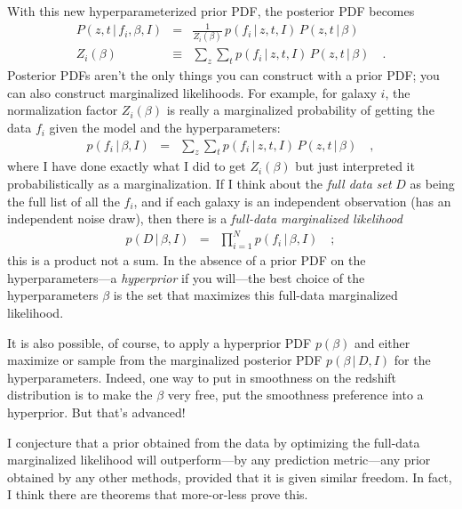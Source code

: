 \documentclass[12pt]{article}
\newcommand{\given}{\,|\,}
\begin{document}
With this new hyper\-parameterized prior PDF, the posterior PDF becomes
\begin{eqnarray}\displaystyle
P(z, t \given f_i, \beta, I) &=&
  \frac{1}{Z_i(\beta)}\,p(f_i \given z, t, I)\,P(z, t \given \beta)
\\
Z_i(\beta) &\equiv& \sum_z\sum_t p(f_i \given z, t, I)\,P(z, t \given \beta)
\quad .
\end{eqnarray}
Posterior PDFs aren't the only things you can construct with a prior
PDF; you can also construct marginalized likelihoods.  For example,
for galaxy $i$, the normalization factor $Z_i(\beta)$ is really a
marginalized probability of getting the data $f_i$ given the model and
the hyper\-parameters:
\begin{eqnarray}\displaystyle
p(f_i \given \beta, I) &=&
  \sum_z\sum_t p(f_i \given z, t, I)\,P(z, t \given \beta)
\quad ,
\end{eqnarray}
where I have done exactly what I did to get $Z_i(\beta)$ but just
interpreted it probabilistically as a marginalization.  If I think
about the \emph{full data set} $D$ as being the full list of all the
$f_i$, and if each galaxy is an independent observation (has an
independent noise draw), then there is a \emph{full-data marginalized
  likelihood}
\begin{eqnarray}\displaystyle
p(D \given \beta, I) &=&
  \prod_{i=1}^N p(f_i \given \beta, I)
\quad ;
\end{eqnarray}
this is a product not a sum.  In the absence of a prior PDF on the
hyper\-parameters---a \emph{hyperprior} if you will---the best choice of
the hyper\-parameters $\beta$ is the set that maximizes this full-data
marginalized likelihood.

It is also possible, of course, to apply a hyper\-prior PDF $p(\beta)$
and either maximize or sample from the marginalized posterior PDF
$p(\beta \given D, I)$ for the hyper\-parameters.  Indeed, one way to
put in smoothness on the redshift distribution is to make the $\beta$
very free, put the smoothness preference into a hyperprior.  But
that's advanced!

I conjecture that a prior obtained from the data by optimizing the
full-data marginalized likelihood will outperform---by any prediction
metric---any prior obtained by any other methods, provided that it is
given similar freedom.  In fact, I think there are theorems that
more-or-less prove this.
\end{document}

